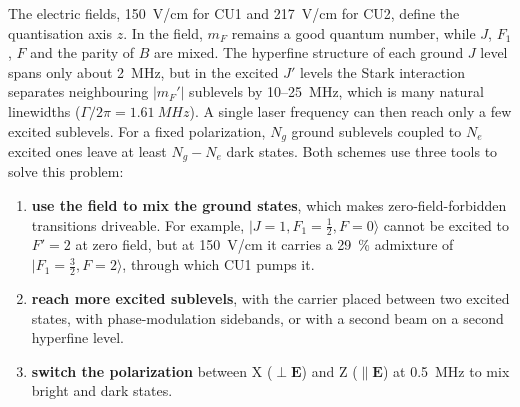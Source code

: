 \documentclass[11pt,a4paper,oneside]{report}
\begin{document}
The electric fields, \SI{150}{V/cm} for CU1 and \SI{217}{V/cm} for CU2, define the quantisation
axis $z$. In the field, $m_F$ remains a good quantum number, while $J$, $F_1$, $F$ and the parity of
$B$ are mixed. The hyperfine structure of each ground $J$ level spans only about \SI{2}{MHz}, but in
the excited $J'$ levels the Stark interaction separates neighbouring $|m_F'|$ sublevels by
10--\SI{25}{MHz}, which is many natural linewidths ($\Gamma/2\pi=\SI{1.61}{MHz}$). A single laser
frequency can then reach only a few excited sublevels. For a fixed polarization, $N_g$ ground
sublevels coupled to $N_e$ excited ones leave at least $N_g-N_e$ dark states. Both schemes use three
tools to solve this problem:
\begin{enumerate}[itemsep=1pt]
  \item \textbf{use the field to mix the ground states}, which makes zero-field-forbidden transitions
        driveable. For example, $|J=1,F_1=\tfrac12,F=0\rangle$ cannot be excited to $F'=2$ at zero
        field, but at \SI{150}{V/cm} it carries a \SI{29}{\percent} admixture of
        $|F_1=\tfrac32,F=2\rangle$, through which CU1 pumps it.
  \item \textbf{reach more excited sublevels}, with the carrier placed between two excited states,
        with phase-modulation sidebands, or with a second beam on a second hyperfine level.
  \item \textbf{switch the polarization} between X ($\perp\mathbf E$) and Z ($\parallel\mathbf E$)
        at \SI{0.5}{MHz} to mix bright and dark states.
\end{enumerate}
\end{document}
